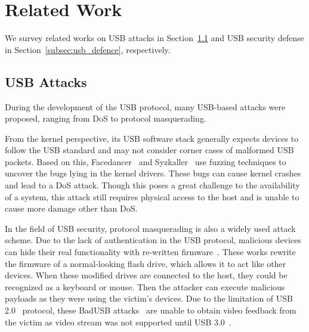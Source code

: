 \section{Related Work}
\label{sec:related_work}

We survey related works on \ac{USB} attacks in Section~\ref{subsec:usb_attack} and
\ac{USB} security defense in Section~\ref{subsec:usb_defence}, respectively.

\subsection{USB Attacks}
\label{subsec:usb_attack}

During the development of the \ac{USB} protocol, many \mbox{\ac{USB}-based} attacks were proposed,
ranging from \ac{DoS} to protocol masquerading.

From the kernel perspective, its \ac{USB} software stack generally expects devices
to follow the \ac{USB} standard and may not consider corner cases of malformed \ac{USB}
packets. Based on this, Facedancer~\cite{facedancer} and
Syzkaller~\cite{syzkaller} use fuzzing techniques to uncover the bugs lying in
the kernel drivers. These bugs can cause kernel crashes and lead to a \ac{DoS} attack.
Though this poses a great challenge to the availability of a system, this
attack still requires physical access to the host and is unable to cause more
damage other than \ac{DoS}.

In the field of \ac{USB} security, protocol masquerading is also a widely used
attack scheme. Due to the lack of authentication in the \ac{USB} protocol, malicious
devices can hide their real functionality with re-written
firmware~\cite{rubber,badusb,rubberducky2020,usbbypassing,iseeyou,usbdriver}.
These works rewrite the firmware of a normal-looking flash drive, which allows
it to act like other devices. When these modified drives are connected to the
host, they could be recognized as a keyboard or mouse. Then the attacker can
execute malicious payloads as they were using the victim's devices. Due to the
limitation of \ac{USB} 2.0~\cite{usb20} protocol, these BadUSB
attacks~\cite{badusb} are unable to obtain video feedback from the victim
as video stream was not supported until \ac{USB} 3.0~\cite{usb30}. 

